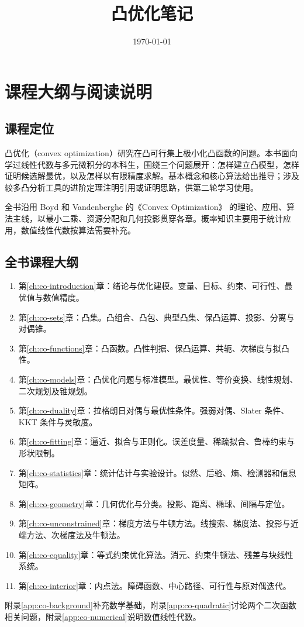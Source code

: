 \documentclass[UTF8,12pt,a4paper,fontset=fandol]{ctexbook}
\title{凸优化笔记}
\author{}
\date{\today}
\begin{document}
\maketitle
\tableofcontents
\clearpage


\chapter*{课程大纲与阅读说明}

\section*{课程定位}

凸优化（convex optimization）研究在凸可行集上极小化凸函数的问题。本书面向学过线性代数与多元微积分的本科生，围绕三个问题展开：怎样建立凸模型，怎样证明候选解最优，以及怎样以有限精度求解。基本概念和核心算法给出推导；涉及较多凸分析工具的进阶定理注明引用或证明思路，供第二轮学习使用。

全书沿用 Boyd 和 Vandenberghe 的《Convex Optimization》\cite{boyd-vandenberghe} 的理论、应用、算法主线，以最小二乘、资源分配和几何投影贯穿各章。概率知识主要用于统计应用，数值线性代数按算法需要补充。

\section*{全书课程大纲}
\begin{enumerate}
  \item 第\ref{ch:co-introduction}章：绪论与优化建模。变量、目标、约束、可行性、最优值与数值精度。
  \item 第\ref{ch:co-sets}章：凸集。凸组合、凸包、典型凸集、保凸运算、投影、分离与对偶锥。
  \item 第\ref{ch:co-functions}章：凸函数。凸性判据、保凸运算、共轭、次梯度与拟凸性。
  \item 第\ref{ch:co-models}章：凸优化问题与标准模型。最优性、等价变换、线性规划、二次规划及锥规划。
  \item 第\ref{ch:co-duality}章：拉格朗日对偶与最优性条件。强弱对偶、Slater 条件、KKT 条件与灵敏度。
  \item 第\ref{ch:co-fitting}章：逼近、拟合与正则化。误差度量、稀疏拟合、鲁棒约束与形状限制。
  \item 第\ref{ch:co-statistics}章：统计估计与实验设计。似然、后验、熵、检测器和信息矩阵。
  \item 第\ref{ch:co-geometry}章：几何优化与分类。投影、距离、椭球、间隔与定位。
  \item 第\ref{ch:co-unconstrained}章：梯度方法与牛顿方法。线搜索、梯度法、投影与近端方法、次梯度法及牛顿法。
  \item 第\ref{ch:co-equality}章：等式约束优化算法。消元、约束牛顿法、残差与块线性系统。
  \item 第\ref{ch:co-interior}章：内点法。障碍函数、中心路径、可行性与原对偶迭代。
\end{enumerate}
附录\ref{app:co-background}补充数学基础，附录\ref{app:co-quadratic}讨论两个二次函数相关问题，附录\ref{app:co-numerical}说明数值线性代数。
\end{document}
